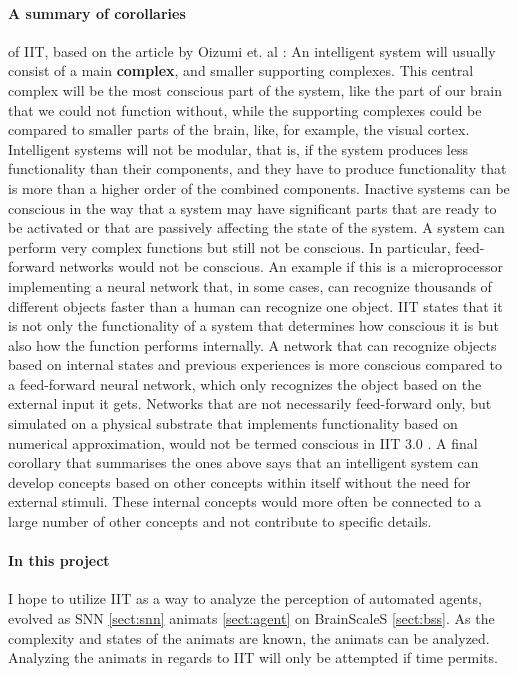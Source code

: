 \paragraph{A summary of corollaries} of IIT, based on the article by Oizumi et. al \cite{oizumi_phenomenology_2014}:
An intelligent system will usually consist of a main \textbf{complex}, and smaller supporting complexes.
This central complex will be the most conscious part of the system, like the part of our brain that we could not function without, while the supporting complexes could be compared to smaller parts of the brain, like, for example, the visual cortex.
Intelligent systems will not be modular, that is, if the system produces less functionality than their components, and they have to produce functionality that is more than a higher order of the combined components.
Inactive systems can be conscious in the way that a system may have significant parts that are ready to be activated or that are passively affecting the state of the system.
A system can perform very complex functions but still not be conscious.
In particular, feed-forward networks would not be conscious.
An example if this is a microprocessor implementing a neural network that, in some cases, can recognize thousands of different objects faster than a human can recognize one object.
IIT states that it is not only the functionality of a system that determines how conscious it is but also how the function performs internally.
A network that can recognize objects based on internal states and previous experiences is more conscious compared to a feed-forward neural network, which only recognizes the object based on the external input it gets.
Networks that are not necessarily feed-forward only, but simulated on a physical substrate that implements functionality based on numerical approximation, would not be termed conscious in IIT 3.0 \cite{marshall_integrated_2016}.
A final corollary that summarises the ones above says that an intelligent system can develop concepts based on other concepts within itself without the need for external stimuli.
These internal concepts would more often be connected to a large number of other concepts and not contribute to specific details.

\paragraph{In this project} I hope to utilize IIT as a way to analyze the perception of automated agents, evolved as SNN \vref{sect:snn} animats \vref{sect:agent} on BrainScaleS \vref{sect:bss}.
As the complexity and states of the animats are known, the animats can be analyzed.
Analyzing the animats in regards to IIT will only be attempted if time permits.
